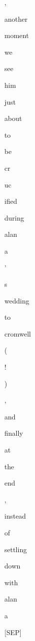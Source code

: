 \documentclass[varwidth=150mm]{standalone}
\begin{document}
\begin{CJK*}{UTF8}{gbsn}
{{{\colorbox{red!8.285377502441406}{\strut ,} \colorbox{red!2.0022993087768555}{\strut another} \colorbox{red!0.0}{\strut moment} \colorbox{red!12.433882713317871}{\strut we} \colorbox{red!4.672092437744141}{\strut see} \colorbox{red!1.6242938041687012}{\strut him} \colorbox{red!2.86220383644104}{\strut just} \colorbox{red!0.0}{\strut about} \colorbox{red!1.3183932304382324}{\strut to} \colorbox{red!1.0859971046447754}{\strut be} \colorbox{red!4.117096424102783}{\strut cr}\colorbox{red!0.0}{\strut uc}\colorbox{red!3.4101803302764893}{\strut ified} \colorbox{red!2.5150821208953857}{\strut during} \colorbox{red!18.979480743408203}{\strut alan}\colorbox{red!11.568181037902832}{\strut a} \colorbox{red!1.0474246740341187}{\strut '} \colorbox{red!1.0684055089950562}{\strut s} \colorbox{red!5.097686290740967}{\strut wedding} \colorbox{red!0.0}{\strut to} \colorbox{red!19.824247360229492}{\strut cromwell} \colorbox{red!11.26390266418457}{\strut (} \colorbox{red!17.882335662841797}{\strut !} \colorbox{red!3.990339756011963}{\strut )} \colorbox{red!2.5635766983032227}{\strut ,} \colorbox{red!11.228074073791504}{\strut and} \colorbox{red!2.511914014816284}{\strut finally} \colorbox{red!2.642774820327759}{\strut at} \colorbox{red!3.0399253368377686}{\strut the} \colorbox{red!2.377018451690674}{\strut end} \colorbox{red!2.931631565093994}{\strut ,} \colorbox{red!1.6546146869659424}{\strut instead} \colorbox{red!1.9218637943267822}{\strut of} \colorbox{red!3.5301384925842285}{\strut settling} \colorbox{red!1.6523462533950806}{\strut down} \colorbox{red!3.2052645683288574}{\strut with} \colorbox{red!24.141845703125}{\strut alan}\colorbox{red!7.255640506744385}{\strut a} \colorbox{red!7.458981513977051}{\strut [SEP]}
}}}
\end{CJK*}
\end{document}

